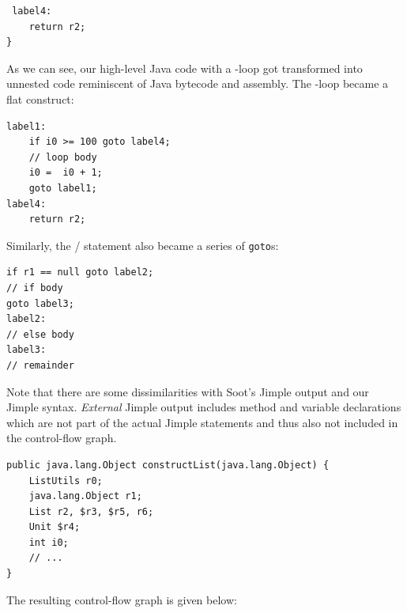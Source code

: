 \begin{example}
\begin{verbatim}
 label4:
    return r2;
}
\end{verbatim}
As we can see, our high-level Java code with a -loop got transformed into unnested code reminiscent of Java bytecode and assembly. The -loop became a flat construct:
\begin{verbatim}
label1:
    if i0 >= 100 goto label4;
    // loop body
    i0 =  i0 + 1;
    goto label1;
label4:
    return r2;
\end{verbatim}
Similarly, the / statement also became a series of \texttt{goto}s:
\begin{verbatim}
if r1 == null goto label2;
// if body
goto label3;
label2:
// else body
label3:
// remainder
\end{verbatim}
Note that there are some dissimilarities with Soot's Jimple output and our Jimple syntax. \emph{External} Jimple output includes method and variable declarations which are not part of the actual Jimple statements and thus also not included in the control-flow graph.
\begin{verbatim}
public java.lang.Object constructList(java.lang.Object) {
    ListUtils r0;
    java.lang.Object r1;
    List r2, $r3, $r5, r6;
    Unit $r4;
    int i0;
    // ...
}
\end{verbatim}
The resulting control-flow graph is given below:\\
\pagebreak

\end{example}
